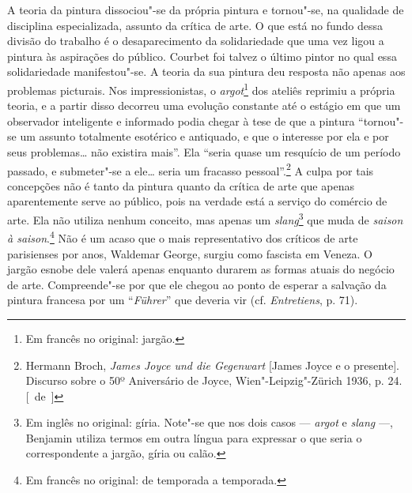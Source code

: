 A teoria da pintura dissociou"-se da própria pintura e tornou"-se, na
qualidade de disciplina especializada, assunto da crítica de arte. O que
está no fundo dessa divisão do trabalho é o desaparecimento da
solidariedade que uma vez ligou a pintura às aspirações do público.
Courbet foi talvez o último pintor no qual essa solidariedade
manifestou"-se. A teoria da sua pintura deu resposta não apenas aos
problemas picturais. Nos impressionistas, o \emph{argot}\footnote{Em francês no original: jargão. \versal{[N.~T.]}} dos ateliês reprimiu a própria teoria,
e a partir disso decorreu uma evolução constante até o
estágio em que um observador inteligente e informado podia chegar à tese
de que a pintura ``tornou"-se um assunto totalmente esotérico e
antiquado, e que o interesse por ela e por seus problemas\ldots{} não
existira mais''. Ela ``seria quase um resquício de um período passado, e
submeter"-se a ele\ldots{} seria um fracasso pessoal''.\footnote{Hermann Broch, \emph{James Joyce und die Gegenwart} {[}James Joyce e o presente{]}. Discurso
  sobre o 50º Aniversário de Joyce, Wien"-Leipzig"-Zürich 1936, p. 24. [~de~]} A
culpa por tais concepções não é tanto da pintura quanto da crítica de
arte que apenas aparentemente serve ao público, pois na verdade está a
serviço do comércio de arte. Ela não utiliza nenhum conceito, mas apenas
um \emph{slang}\footnote{Em inglês no original: gíria. Note"-se que
  nos dois casos --- \emph{argot} e \emph{slang} ---, Benjamin utiliza termos em
  outra língua para expressar o que seria o correspondente a jargão,
  gíria ou calão. \versal{[N.~T.]}} que muda de \emph{saison à saison}.\footnote{Em francês no original: de temporada a temporada. \versal{[N.~T.]}} Não é um acaso que
o mais representativo dos críticos de arte parisienses por anos,
Waldemar George, surgiu como fascista em Veneza. O jargão esnobe dele
valerá apenas enquanto durarem as formas atuais do negócio de arte.
Compreende"-se por que ele chegou ao ponto de esperar a salvação da
pintura francesa por um ``\emph{Führer}'' que deveria vir (cf.
\emph{Entretiens}, p. 71).

